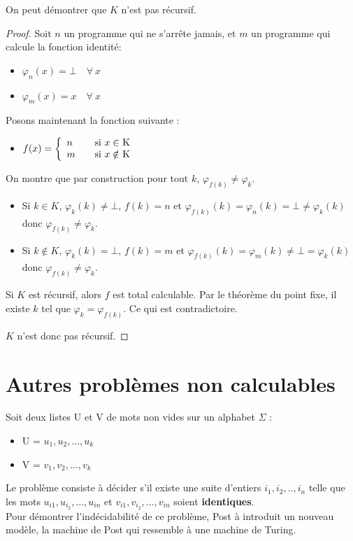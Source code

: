 \begin{myrem}
	On peut démontrer que $K$ n'est pas récursif.

    \begin{proof}
	Soit $n$ un programme qui ne s'arrête jamais, et $m$ un programme qui calcule la fonction identité:
		\begin{itemize}
		\item $\varphi_n(x) = \bot \quad \forall \ x$
		\item $\varphi_m(x) = x \quad \forall  \ x$
	\end{itemize}
	Posons maintenant la  fonction suivante :
	\begin{itemize}

		\item $ f(x) = \left\{
		\begin{array}{l l}
			n & \quad \text{si $x\in$ K}\\
    		m & \quad \text{si $x\notin$ K}
		\end{array} \right.$
	\end{itemize}

    On montre que par construction pour tout $k$, $\varphi_{f(k)} \neq \varphi_k$.
    \begin{itemize}
      \item Si $k \in K$, $\varphi_k(k) \neq \bot$, $f(k) = n$ et
        $\varphi_{f(k)}(k) = \varphi_n(k) = \bot \neq \varphi_k(k)$ donc $\varphi_{f(k)} \neq \varphi_k$.
      \item Si $k \notin K$, $\varphi_k(k) = \bot$, $f(k) = m$ et
        $\varphi_{f(k)}(k) = \varphi_m(k) \neq \bot = \varphi_k(k)$ donc $\varphi_{f(k)} \neq \varphi_k$.
    \end{itemize}
    Si $K$ est récursif, alors $f$ est total calculable.
	Par le théorème du point fixe, il existe $k$ tel que $\varphi_k = \varphi_{f(k)}$.
    Ce qui est contradictoire.

    $K$ n'est donc pas récursif.
  \end{proof}

\end{myrem}

\section{Autres problèmes non calculables}
\label{sec:autres_probl_mes_non_calculable}

\begin{mydef} Soit deux listes U et V
	de mots non vides sur un alphabet $\Sigma$ :
	\begin{itemize}
		\item U = ${u_1,u_2,...,u_k}$
		\item V = ${v_1,v_2,...,v_k}$
	\end{itemize}
	Le problème consiste à décider s’il existe une suite d'entiers
	$i_1,i_2,..,i_n$ telle que les mots $u_{i1},u_{i_2},...,u_{in}$ et
	$v_{i1},v_{i_2},...,v_{in}$ soient \textbf{identiques}. \\
	Pour démontrer l'indécidabilité de ce problème, Post à introduit un
	nouveau modèle, la machine de Post qui ressemble à une machine de Turing.
\end{mydef}

